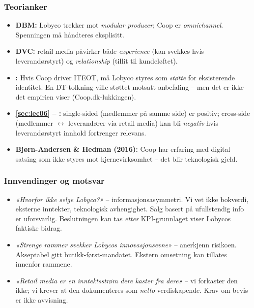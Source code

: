 \subsubsection*{Teorianker}
\begin{itemize}
  \item \textbf{DBM:} Lobyco trekker mot \emph{modular producer}; Coop er
    \emph{omnichannel}. Spenningen må håndteres eksplisitt.
  \item \textbf{DVC:} retail media påvirker både \emph{experience} (kan
    svekkes hvis leverandørstyrt) og \emph{relationship} (tillit til
    kundeløftet).
  \item \textbf{:} Hvis Coop driver ITEOT, må Lobyco
    styres som \emph{støtte} for eksisterende identitet. En DT-tolkning
    ville støttet motsatt anbefaling -- men det er ikke det empirien viser
    (Coop.dk-lukkingen).
  \item \textbf{\autoref{sec:lec06} -- :} single-sided
    (medlemmer på samme side) er positiv; cross-side (medlemmer $\leftrightarrow$
    leverandører via retail media) kan bli \emph{negativ} hvis
    leverandørstyrt innhold fortrenger relevans.
  \item \textbf{Bjørn-Andersen \& Hedman (2016):} Coop har erfaring med
    digital satsing som ikke styres mot kjernevirksomhet -- det blir
    teknologisk gjeld.
\end{itemize}

\subsubsection*{Innvendinger og motsvar}
\begin{itemize}
  \item \emph{«Hvorfor ikke selge Lobyco?»} -- informasjonsasymmetri. Vi
    vet ikke bokverdi, eksterne inntekter, teknologisk avhengighet. Salg
    basert på ufullstendig info er uforsvarlig. Beslutningen kan tas
    \emph{etter} KPI-grunnlaget viser Lobycos faktiske bidrag.
  \item \emph{«Strenge rammer svekker Lobycos innovasjonsevne»} -- anerkjenn
    risikoen. Akseptabel gitt butikk-først-mandatet. Ekstern omsetning kan
    tillates innenfor rammene.
  \item \emph{«Retail media er en inntektsstrøm dere kaster fra dere»} --
    vi forkaster den ikke; vi krever at den dokumenteres som \emph{netto}
    verdiskapende. Krav om bevis er ikke avvisning.
\end{itemize}

